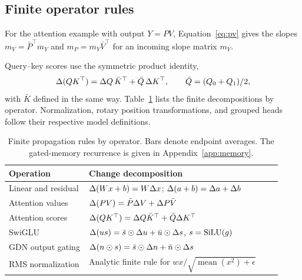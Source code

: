 \subsection{Finite operator rules}
\label{app:operators}
For the attention example with output $Y=PV$, Equation~\ref{eq:pv} gives the slopes $m_V=\bar P^\top m_Y$ and $m_P=m_Y\bar V^\top$ for an incoming slope matrix $m_Y$.

Query--key scores use the symmetric product identity,
\begin{equation}
\Delta(QK^\top)=\Delta Q\,\bar K^\top+\bar Q\,\Delta K^\top,\qquad
\bar Q=(Q_0+Q_1)/2,
\label{eq:qk}
\end{equation}
with $\bar K$ defined in the same way. Table~\ref{tab:rules} lists the finite decompositions by operator. Normalization, rotary position transformations, and grouped heads follow their respective model definitions.

\begin{table}[htbp]
\centering
\small
\caption{Finite propagation rules by operator. Bars denote endpoint averages. The gated-memory recurrence is given in Appendix~\ref{app:memory}.}
\label{tab:rules}
\begin{tabular}{@{}p{0.27\linewidth}p{0.65\linewidth}@{}}
\toprule
Operation & Change decomposition \\
\midrule
Linear and residual & $\Delta(Wx+b)=W\Delta x$; $\Delta(a+b)=\Delta a+\Delta b$ \\
Attention values & $\Delta(PV)=\bar P\Delta V+\Delta P\bar V$ \\
Attention scores & $\Delta(QK^\top)=\Delta Q\bar K^\top+\bar Q\Delta K^\top$ \\
SwiGLU & $\Delta(us)=\bar s\odot\Delta u+\bar u\odot\Delta s$, $s=\operatorname{SiLU}(g)$ \\
GDN output gating & $\Delta(n\odot s)=\bar s\odot\Delta n+\bar n\odot\Delta s$ \\
RMS normalization & Analytic finite rule for $wx/\sqrt{\operatorname{mean}(x^2)+\epsilon}$ \\
\bottomrule
\end{tabular}
\end{table}

